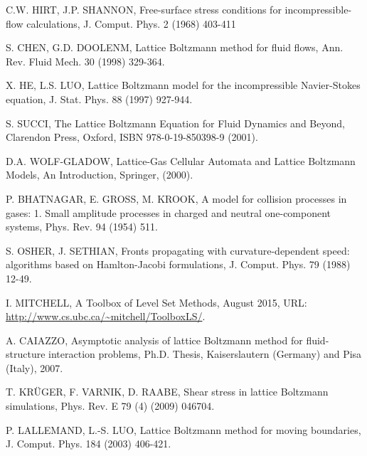 \documentclass[final,leqno,onefignum,onetabnum]{siamltexmm}
\begin{document}
\begin{thebibliography}{1}
 {\sc C.W. HIRT, J.P. SHANNON}, Free-surface stress conditions for incompressible-flow calculations, J. Comput. Phys. 2 (1968) 403-411

 {\sc S. CHEN, G.D. DOOLENM}, Lattice Boltzmann method for fluid flows, Ann. Rev. Fluid Mech. 30 (1998) 329-364.

 {\sc X. HE, L.S. LUO}, Lattice Boltzmann model for the incompressible Navier-Stokes equation, J. Stat. Phys. 88 (1997) 927-944.

 {\sc S. SUCCI}, The Lattice Boltzmann Equation for Fluid Dynamics and Beyond, Clarendon Press, Oxford, ISBN 978-0-19-850398-9 (2001).

 {\sc D.A. WOLF-GLADOW}, Lattice-Gas Cellular Automata and Lattice Boltzmann Models, An Introduction, Springer, (2000).

 {\sc P. BHATNAGAR, E. GROSS, M. KROOK}, A model for collision processes in gases: 1. Small amplitude processes in charged and neutral one-component systems, Phys. Rev. 94 (1954) 511.

 {\sc S. OSHER, J. SETHIAN}, Fronts propagating with curvature-dependent speed: algorithms based on Hamlton-Jacobi formulations, J. Comput. Phys. 79 (1988) 12-49.

I. MITCHELL, A Toolbox of Level Set Methods, August 2015, URL: \url{http://www.cs.ubc.ca/~mitchell/ToolboxLS/}.

 {\sc A. CAIAZZO}, Asymptotic analysis of lattice Boltzmann method for fluid-structure interaction problems, Ph.D. Thesis, Kaiserslautern (Germany) and Pisa (Italy), 2007.

 {\sc T. KR\"UGER, F. VARNIK, D. RAABE}, Shear stress in lattice Boltzmann simulations, Phys. Rev. E 79 (4) (2009) 046704.

 {\sc P. LALLEMAND, L.-S. LUO}, Lattice Boltzmann method for moving boundaries, J. Comput. Phys. 184 (2003) 406-421.

\end{thebibliography}
\end{document}
